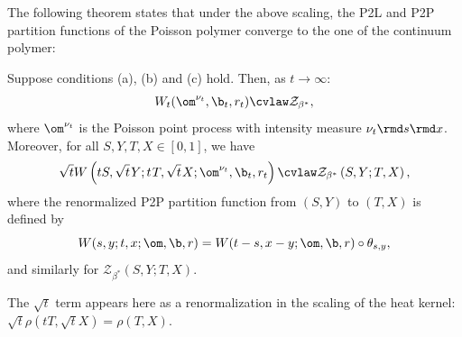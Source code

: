 The following theorem states that under the above scaling, the P2L and P2P partition functions of the Poisson polymer converge to the one of the continuum polymer:
\begin{theorem} \label{th:cv_Wt_interReg} Suppose conditions (a), (b) and (c) hold. Then, as $t\to\infty$:
\begin{equation} \label{eq:P2PcvlawTh}
W_t(\om^{\nu_t},\b_t,r_t) \cvlaw \mathcal{Z}_{\beta^*},
\end{equation}
where $\om^{\nu_t}$ is the Poisson point process with intensity measure $\nu_t \rmd s \rmd x$.
Moreover, for all $S,Y,T,X \in [0,1]$, we have
\begin{equation}
\sqrt{t} W\left(tS,\sqrt{t} \hspace{0.3mm}Y;t\hspace{0.3mm}T,\sqrt{t}\hspace{0.3mm}X;\om^{\nu_t},\b_t,r_t\right) \cvlaw \mathcal{Z}_{\beta^*}\left(S,Y;T,X\right),
\end{equation}
where the renormalized P2P partition function from $(S,Y)$ to $(T,X)$ is defined by
\begin{equation}
W(s,y;t,x;\om,\b,r) = W(t-s,x-y;\om,\b,r)\circ \theta_{s,y},
\end{equation}
and similarly for $\mathcal{Z}_{\beta^*}\left(S,Y;T,X\right)$.
\end{theorem}
\begin{remark} \label{rk:sqrtt}
The $\sqrt{t}$ term appears here as a renormalization in the scaling of the heat kernel: $\sqrt{t}\rho\left(tT,\sqrt{t}X\right) = \rho(T,X)$.
\end{remark}
